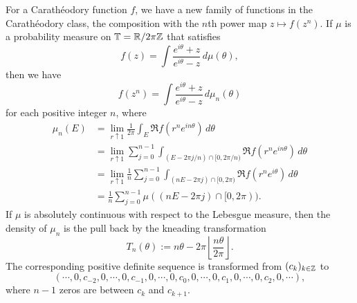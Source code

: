 \documentclass{../../small}
\begin{document}
\begin{ex}
For a Carath\'eodory function $f$, we have a new family of functions in the Carath\'eodory class, the composition with the $n$th power map $z\mapsto f(z^n)$.
If $\mu$ is a probability measure on $\mathbb{T}=\mathbb{R}/2\pi\mathbb{Z}$ that satisfies
\[f(z)=\int\frac{e^{i\theta}+z}{e^{i\theta}-z}\,d\mu(\theta),\]
then we have 
\[f(z^n)=\int\frac{e^{i\theta}+z}{e^{i\theta}-z}\,d\mu_n(\theta)\]
for each positive integer $n$, where
\begin{align*}
\mu_n(E)&=\lim_{r\uparrow1}\frac1{2\pi}\int_E\Re f(r^ne^{in\theta})\,d\theta\\
&=\lim_{r\uparrow1}\sum_{j=0}^{n-1}\int_{(E-2\pi j/n)\cap[0,2\pi/n)}\Re f(r^ne^{in\theta})\,d\theta\\
&=\lim_{r\uparrow1}\frac1n\sum_{j=0}^{n-1}\int_{(nE-2\pi j)\cap[0,2\pi)}\Re f(r^ne^{i\theta})\,d\theta\\
&=\frac1n\sum_{j=0}^{n-1}\mu((nE-2\pi j)\cap[0,2\pi)).
\end{align*}
If $\mu$ is absolutely continuous with respect to the Lebesgue measure, then the density of $\mu_n$ is the pull back by the kneading transformation
\[T_n(\theta):=n\theta-2\pi\left\lfloor\frac{n\theta}{2\pi}\right\rfloor.\]
The corresponding positive definite sequence is transformed from $(c_k)_{k\in\mathbb{Z}}$ to
\[(\cdots,0,c_{-2},0,\cdots,0,c_{-1},0,\cdots,0,c_0,0,\cdots,0,c_1,0,\cdots,0,c_2,0,\cdots),\]
where $n-1$ zeros are between $c_k$ and $c_{k+1}$.
\end{ex}
\end{document}
